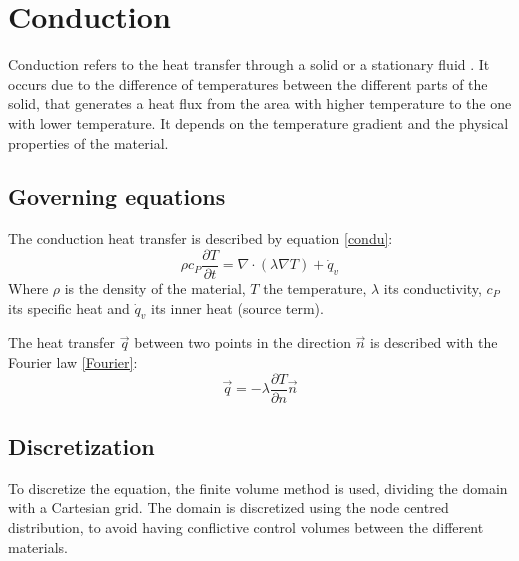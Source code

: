 \chapter{Conduction}
Conduction refers to the heat transfer through a solid or a stationary fluid \cite{Bergman2011}. It occurs due to the difference of temperatures between the different parts of the solid, that generates a heat flux from the area with higher temperature to the one with lower temperature. It depends on the temperature gradient and the physical properties of the material.

\section{Governing equations}
The conduction heat transfer is described by equation \ref{condu}:
\begin{equation}
\rho c_{P}\frac{\partial T}{\partial t}=\nabla\cdot\left(\lambda\nabla T\right)+\dot{q}_{v}
\label{condu}
\end{equation}
Where $\rho$ is the density of the material, $T$ the temperature, $\lambda$ its conductivity, $c_{P}$ its specific heat and $\dot{q}_{v}$ its inner heat (source term).

The heat transfer $\vec{q}$ between two points in the direction $\vec{n}$ is described with the Fourier law \ref{Fourier}:
\begin{equation}
\vec{q}=-\lambda\frac{\partial T}{\partial n}\vec{n}
\label{Fourier}
\end{equation}

\section{Discretization}
To discretize the equation, the finite volume method is used, dividing the domain with a Cartesian grid. The domain is discretized using the node centred distribution, to avoid having conflictive control volumes between the different materials.

